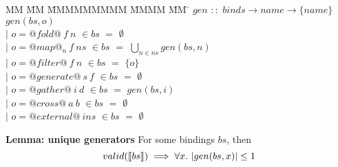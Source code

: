 \begin{tabbing}
MM \= MM \= MMMMMMMMM \= MMMM \= MM \= \kill
$gen$  \>$::$\> $binds \rightarrow name \rightarrow \{name\}$ \\
$gen(bs,o)$    \\
            \> $|$ \> $o = @fold@~f~n$      \> $\in bs$ \> $=$ \> $\emptyset$ \\
            \> $|$ \> $o = @map@_n~f~ns$    \> $\in bs$ \> $=$ \> $\bigcup_{n \in ns} gen(bs, n)$ \\
            \> $|$ \> $o = @filter@~f~n$    \> $\in bs$ \> $=$ \> $\{o\}$       \\
            \> $|$ \> $o = @generate@~s~f$  \> $\in bs$ \> $=$ \> $\emptyset$ \\
            \> $|$ \> $o = @gather@~i~d$    \> $\in bs$ \> $=$ \> $gen(bs,i)$ \\
            \> $|$ \> $o = @cross@~a~b$     \> $\in bs$ \> $=$ \> $\emptyset$ \\
            \> $|$ \> $o = @external@~ins$  \> $\in bs$ \> $=$ \> $\emptyset$ \\
\end{tabbing}

\textbf{Lemma: unique generators}
For some bindings $bs$, then
\[
valid(\llbracket bs \rrbracket) \implies \forall x.\ |gen(bs, x)| \le 1
\]

